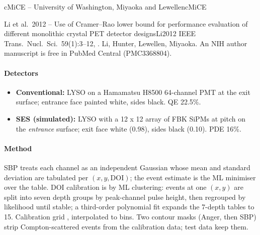 \begin{programnote}{cMiCE -- University of Washington, Miyaoka and Lewellen}{cMiCE}
\begin{papernote}{Li et al.\ 2012 -- Use of Cramer--Rao lower bound for performance evaluation of different monolithic crystal PET detector designs}{Li2012}
IEEE Trans.\ Nucl.\ Sci.\ 59(1):3--12, . Li,
Hunter, Lewellen, Miyaoka. An NIH author manuscript is free in PubMed Central
(PMC3368804).

\paragraph{Detectors}
\begin{itemize}
	\item \textbf{Conventional:}  LYSO on a
		Hamamatsu H8500 64-channel PMT at the exit surface; entrance face painted
		white, sides black. QE 22.5\%.
	\item \textbf{SES (simulated):} 
		LYSO with a 12 x 12 array of  FBK SiPMs
		at  pitch on the \emph{entrance} surface; exit face white (0.98),
		sides black (0.10). PDE 16\%.
\end{itemize}

\paragraph{Method}
SBP treats each channel as an independent Gaussian whose mean and standard
deviation are tabulated per $(x, y, \text{DOI})$; the event estimate is the ML
minimiser over the table. DOI calibration is by ML clustering: events at one
$(x, y)$ are split into seven depth groups by peak-channel pulse height, then
regrouped by likelihood until stable; a third-order polynomial fit expands the
7-depth tables to 15. Calibration grid , interpolated to 
bins. Two contour masks (Anger, then SBP) strip Compton-scattered events from the
calibration data; test data keep them.


\end{papernote}
\end{programnote}
